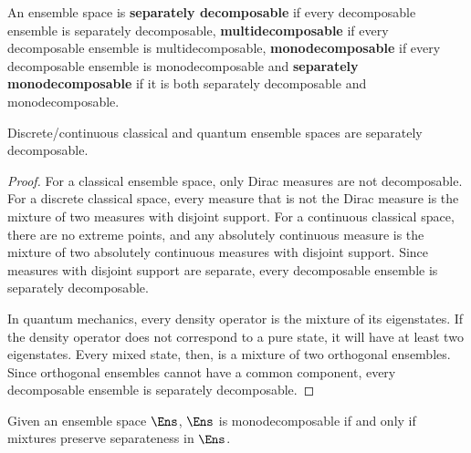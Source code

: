 \begin{mathSection}
\begin{defn}
	An ensemble space is \textbf{separately decomposable} if every decomposable ensemble is separately decomposable, \textbf{multidecomposable} if every decomposable ensemble is multidecomposable, \textbf{monodecomposable} if every decomposable ensemble is monodecomposable and \textbf{separately monodecomposable} if it is both separately decomposable and monodecomposable.
\end{defn}

\begin{prop}
	Discrete/continuous classical and quantum ensemble spaces are separately decomposable.
\end{prop}

\begin{proof}
	For a classical ensemble space, only Dirac measures are not decomposable. For a discrete classical space, every measure that is not the Dirac measure is the mixture of two measures with disjoint support. For a continuous classical space, there are no extreme points, and any absolutely continuous measure is the mixture of two absolutely continuous measures with disjoint support. Since measures with disjoint support are separate, every decomposable ensemble is separately decomposable.
	
	In quantum mechanics, every density operator is the mixture of its eigenstates. If the density operator does not correspond to a pure state, it will have at least two eigenstates. Every mixed state, then, is a mixture of two orthogonal ensembles. Since orthogonal ensembles cannot have a common component, every decomposable ensemble is separately decomposable.
\end{proof}

\begin{prop}
	Given an ensemble space $\Ens$, $\Ens$ is monodecomposable if and only if mixtures preserve separateness in $\Ens$.
\end{prop}

\begin{figure}[H]
	\centering
\end{figure}


\end{mathSection}
